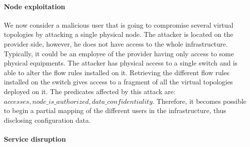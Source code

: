 \paragraph{Node exploitation} We now consider a malicious user that is going to compromise several virtual topologies by attacking a single physical node. 
The attacker is located on the provider side, however, he does not have access to the whole infrastructure.
Typically, it could be an employee of the provider having only access to some physical equipments.
The attacker has physical access to a single switch and is able to alter the flow rules installed on it.
Retrieving the different flow rules installed on the switch gives access to a fragment of all the virtual topologies deployed on it.
The predicates affected by this attack are: $accesses, node\_is\_authorized, data\_confidentiality$.
Therefore, it becomes possible to begin a partial mapping of the different users in the infrastructure, thus disclosing configuration data.

\paragraph{Service disruption}